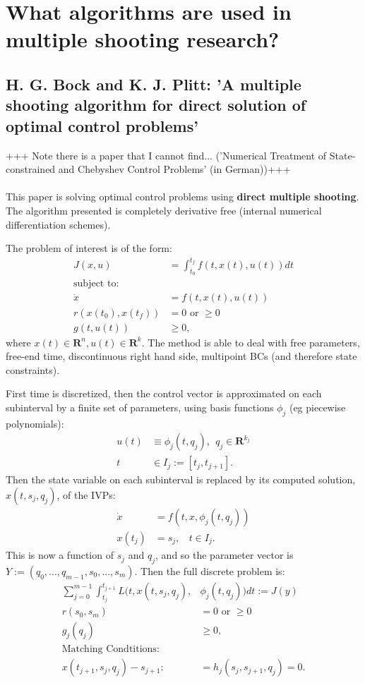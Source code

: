 \documentclass[11pt, a4paper]{article}
\theoremstyle{definition}
\begin{document}
\section{What algorithms are used in multiple shooting research?}

\subsection{H. G. Bock and K. J. Plitt: 'A multiple shooting algorithm for direct solution of optimal control problems'}
+++ Note there is a paper that I cannot find... ('Numerical Treatment of State-constrained and Chebyshev Control Problems' (in German))+++\\
\\
This paper is solving optimal control problems using \textbf{direct multiple shooting}. The algorithm presented is completely derivative free (internal numerical differentiation schemes).

The problem of interest is of the form:
\begin{align*}
J(x,u) &= \int_{t_0}^{t_f} f(t,x(t),u(t))dt\\
\text{subject to:}&\\
\dot{x}&= f(t,x(t),u(t))\\
r(x(t_0),x(t_f)) &= 0 \text{ or } \geq 0\\
g(t,u(t)) &\geq 0,
\end{align*}
where $x(t) \in \mathbf{R}^n, u(t) \in \mathbf{R}^k$.
The method is able to deal with free parameters, free-end time, discontinuous right hand side, multipoint BCs (and therefore state constraints).

First time is discretized, then the control vector is approximated on each subinterval by a finite set of parameters, using basis functions $\phi_j$ (eg piecewise polynomials):
\begin{align*}
u(t) & \equiv\phi_j(t,q_j), \ \ q_j \in \mathbf{R}^{k_j}\\
t & \in I_j:=[t_j, t_{j+1}].
\end{align*}
Then the state variable on each subinterval is replaced by its computed solution, $x(t,s_j,q_j)$, of the IVPs:
\begin{align*}
\dot{x} &= f(t,x, \phi_j(t,q_j))\\
x(t_j) &= s_j, \ \ \ \ t \in I_j.
\end{align*}
This is now a function of $s_j$ and $q_j$, and so the parameter vector is $Y:= (q_0,...,q_{m-1}, s_0,...,s_m)$.
Then the full discrete problem is:
\begin{align*}
\sum_{j=0}^{m-1} \int_{t_j}^{t_{j+1}} L(t, x(t,s_j,q_j), &\phi_j(t,q_j))dt:= J(y)\\
r(s_0,s_m)&=0 \text{ or } \geq 0\\
g_j(q_j) &\geq 0,\\
\text{Matching Condtitions:}&\\
x(t_{j+1}, s_j,q_j) - s_{j+1}:&=h_j(s_j,s_{j+1},q_j)=0.
\end{align*}
\end{document}
